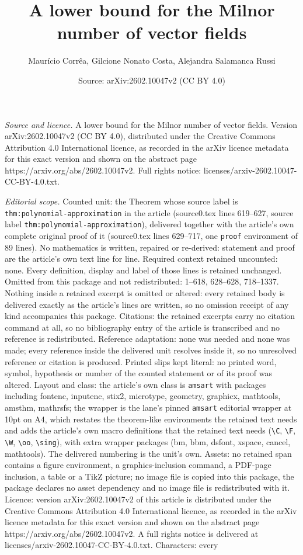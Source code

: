\documentclass[10pt,a4paper]{amsart}
\title[A lower bound for the Milnor number of vector fields]{A lower bound for the Milnor number of vector fields}
\author{Maur\'icio Corr\^ea, Gilcione Nonato Costa, Alejandra Salamanca Russi}
\date{Source: arXiv:2602.10047v2 (CC BY 4.0)}
\begin{document}
\maketitle

\noindent\emph{Source and licence.} A lower bound for the Milnor number of vector fields. Version arXiv:2602.10047v2 (CC BY 4.0), distributed under the Creative Commons Attribution 4.0 International licence, as recorded in the arXiv licence metadata for this exact version and shown on the abstract page https://arxiv.org/abs/2602.10047v2. Full rights notice: licenses/arxiv-2602.10047-CC-BY-4.0.txt.\par\smallskip

\noindent\textit{Editorial scope.} Counted unit: the Theorem whose source label is \texttt{thm:polynomial-approximation} in the article (source0.tex lines 619--627, source label \texttt{thm:polynomial-approximation}), delivered together with the article's own complete original proof of it (source0.tex lines 629--717, one \texttt{proof} environment of 89 lines). No mathematics is written, repaired or re-derived: statement and proof are the article's own text line for line. Required context retained uncounted: none. Every definition, display and label of those lines is retained unchanged. Omitted from this package and not redistributed: 1--618, 628--628, 718--1337. Nothing inside a retained excerpt is omitted or altered: every retained body is delivered exactly as the article's lines are written, so no omission receipt of any kind accompanies this package. Citations: the retained excerpts carry no citation command at all, so no bibliography entry of the article is transcribed and no reference is redistributed. Reference adaptation: none was needed and none was made; every reference inside the delivered unit resolves inside it, so no unresolved reference or citation is produced. Printed slips kept literal: no printed word, symbol, hypothesis or number of the counted statement or of its proof was altered. Layout and class: the article's own class is \texttt{amsart} with packages including fontenc, inputenc, stix2, microtype, geometry, graphicx, mathtools, amsthm, mathrsfs; the wrapper is the lane's pinned \texttt{amsart} editorial wrapper at 10pt on A4, which restates the theorem-like environments the retained text needs and adds the article's own macro definitions that the retained text needs (\texttt{\textbackslash C}, \texttt{\textbackslash F}, \texttt{\textbackslash W}, \texttt{\textbackslash oo}, \texttt{\textbackslash sing}), with extra wrapper packages (bm, bbm, dsfont, xspace, cancel, mathtools). The delivered numbering is the unit's own. Assets: no retained span contains a figure environment, a graphics-inclusion command, a PDF-page inclusion, a table or a TikZ picture; no image file is copied into this package, the package declares no asset dependency and no image file is redistributed with it. Licence: version arXiv:2602.10047v2 of this article is distributed under the Creative Commons Attribution 4.0 International licence, as recorded in the arXiv licence metadata for this exact version and shown on the abstract page https://arxiv.org/abs/2602.10047v2. A full rights notice is delivered at licenses/arxiv-2602.10047-CC-BY-4.0.txt. Characters: every 
\end{document}
